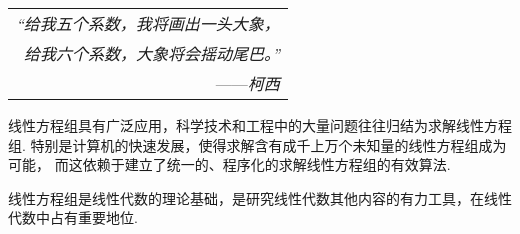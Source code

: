 \begin{flushright}
    \begin{tabular}{r||}
        \textit{“给我五个系数，我将画出一头大象，}\\
        \textit{给我六个系数，大象将会摇动尾巴。”}\\
        ——\textit{柯西}
    \end{tabular}
\end{flushright}

线性方程组具有广泛应用，科学技术和工程中的大量问题往往归结为求解线性方程组. 特别是计算机的快速发展，使得求解含有成千上万个未知量的线性方程组成为可能，
而这依赖于建立了统一的、程序化的求解线性方程组的有效算法. 

线性方程组是线性代数的理论基础，是研究线性代数其他内容的有力工具，在线性代数中占有重要地位.